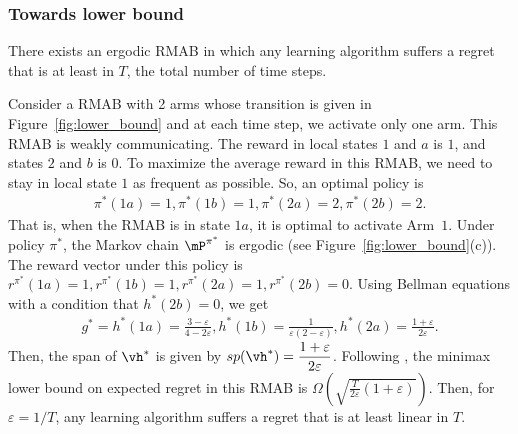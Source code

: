 \subsubsection{Towards lower bound}

\begin{thm}
    There exists an ergodic RMAB in which any learning algorithm suffers a regret that is at least in $T$, the total number of time steps.
\end{thm}

Consider a RMAB with 2 arms whose transition is given in Figure~\ref{fig:lower_bound} and at each time step, we activate only one arm.
This RMAB is weakly communicating.
The reward in local states $1$ and $a$ is $1$, and states $2$ and $b$ is $0$.
To maximize the average reward in this RMAB, we need to stay in local state $1$ as frequent as possible.
So, an optimal policy is
\begin{align*}
    \pi^*(1a)=1, \pi^*(1b)=1, \pi^*(2a)=2, \pi^*(2b)=2.
\end{align*}
That is, when the RMAB is in state $1a$, it is optimal to activate Arm~$1$.
Under policy $\pi^*$, the Markov chain $\mP^{\pi^*}$ is ergodic (see Figure~\ref{fig:lower_bound}(c)).
The reward vector under this policy is $r^{\pi^*}(1a)=1, r^{\pi^*}(1b)=1, r^{\pi^*}(2a)=1, r^{\pi^*}(2b)=0$.
Using Bellman equations with a condition that $h^*(2b)=0$, we get
\begin{align*}
    g^*=h^*(1a)=\frac{3-\varepsilon}{4-2\varepsilon}, h^*(1b)=\frac1{\varepsilon(2-\varepsilon)},
    h^*(2a)=\frac{1+\varepsilon}{2\varepsilon}.
\end{align*}
Then, the span of $\vh^*$ is given by $sp(\vh^*)=\displaystyle\frac{1+\varepsilon}{2\varepsilon}$.
Following \cite{jaksch2010near, zhang2019regret}, the minimax lower bound on expected regret in this RMAB is $\displaystyle\Omega\left(\sqrt{\frac{T}{2\varepsilon}(1+\varepsilon)}\right)$.
Then, for $\varepsilon=1/T$, any learning algorithm suffers a regret that is at least linear in $T$.


